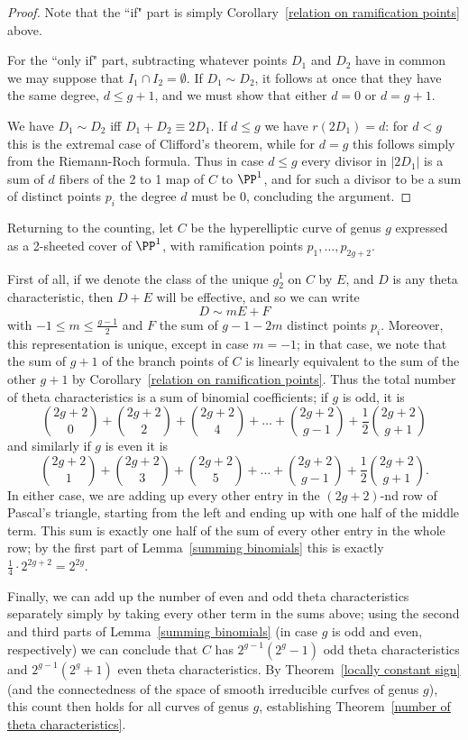 \begin{proof}
Note that the ``if" part is simply Corollary~\ref{relation on ramification points} above.

For the ``only if" part, subtracting whatever points $D_1$ and $D_2$ have in common we may suppose
that $I_1\cap I_2 = \emptyset$. If $D_1\sim D_2$, it follows at once that they have the same degree, $d\leq g+1$, and we must show that either $d=0$ or $d=g+1$.

We have $D_1\sim D_2$ iff $D_1+D_2\equiv 2D_1$. If
$d\leq g$ we have $r(2D_1) = d$: for $d<g$ this is
the extremal case of Clifford's theorem, while for $d = g$ this follows simply from the 
Riemann-Roch formula. Thus in case $d \leq g$ every divisor in $|2D_1|$ is a sum of $d$ fibers of the 
2 to 1 map of $C$ to $\PP^1$, and for such a divisor to be a sum of distinct points $p_i$
the degree $d$ must be 0, concluding the argument.
\end{proof}


Returning to the counting, let $C$ be the hyperelliptic curve of genus $g$ expressed as a 2-sheeted cover of $\PP^1$, with ramification points $p_1,\dots,p_{2g+2}$. 

First of all, if we denote the class of the unique $g^1_2$ on $C$ by $E$, and $D$ is any theta characteristic, then $D+E$ will be effective, and so we can write
$$
D \sim mE + F
$$
with $-1 \leq m \leq \frac{g-1}{2}$ and $F$ the sum of $g-1-2m$ distinct points $p_i$. Moreover, this representation is unique, except in case $m=-1$; in that case, we note that the sum of $g+1$ of the branch points of $C$ is linearly equivalent to the sum of the other $g+1$ by Corollary~\ref{relation on ramification points}. Thus the total number of theta characteristics is a sum of binomial coefficients; if $g$ is odd, it is
$$
\binom{2g+2}{0} + \binom{2g+2}{2} + \binom{2g+2}{4} + \dots + \binom{2g+2}{g-1} + \frac{1}{2}\binom{2g+2}{g+1}
$$ 
and similarly if $g$ is even it is
$$
\binom{2g+2}{1} + \binom{2g+2}{3} + \binom{2g+2}{5} + \dots + \binom{2g+2}{g-1} + \frac{1}{2}\binom{2g+2}{g+1}.
$$ 
In either case, we are adding up every other entry in the $(2g+2)$-nd row of Pascal's triangle, starting from the left and ending up with one half of the middle term. This sum is exactly one half of the sum of every other entry in the whole row; by the first part of Lemma~\ref{summing binomials} this is exactly $\frac{1}{4} \cdot 2^{2g+2} = 2^{2g}$.

Finally, we can add up the number of even and odd theta characteristics separately simply by taking every other term in the sums above; using the second and third parts of Lemma~\ref{summing binomials} (in case $g$ is odd and even, respectively) we can conclude that $C$ has $2^{g-1}(2^g-1)$ odd theta characteristics and $2^{g-1}(2^g+1)$ even theta characteristics. By Theorem~\ref{locally constant sign} (and the connectedness of the space of smooth irreducible curfves of genus $g$), this count then holds for all curves of genus $g$, establishing Theorem~\ref{number of theta characteristics}.

